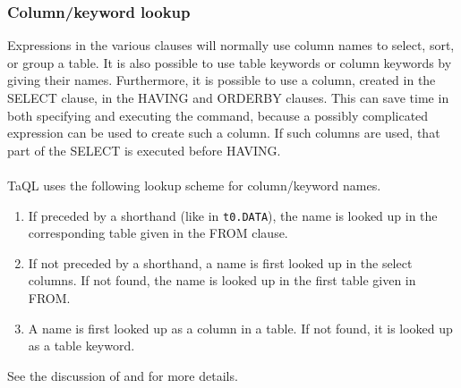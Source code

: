 \subsubsection{Column/keyword lookup}
Expressions in the various clauses will normally use column names to
select, sort, or group a table. It is also possible to use table
keywords or column keywords by giving their names.
Furthermore, it is possible to use a column,
created in the SELECT clause, in the HAVING and ORDERBY clauses. This
can save time in both specifying and executing the command, because
a possibly complicated expression can be used to create such a column. If such
columns are used, that part of the SELECT is executed before HAVING.

\paragraph*{}
TaQL uses the following lookup scheme for column/keyword names.
\begin{enumerate}
\item If preceded by a shorthand (like in \texttt{t0.DATA}), the name
  is looked up in the corresponding table given in the FROM clause.
\item If not preceded by a shorthand, a name is first looked up in
  the select columns. If not found, the name is looked up in the first
  table given in FROM.
\item A name is first looked up as a column in a table. If not found,
  it is looked up as a table keyword.
\end{enumerate}
See the discussion of 
and  for more details.


